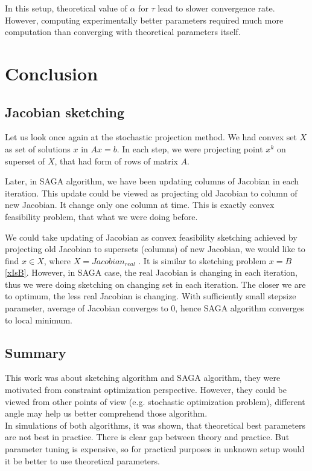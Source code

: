 \documentclass[11pt]{book}
\theoremstyle{definition}
\begin{document}
	In this setup, theoretical value of $\alpha$ for $\tau$ lead to slower convergence rate. However, computing experimentally better parameters required much more computation than converging with theoretical parameters itself.
	
	\chapter{Conclusion}
	
	\section{Jacobian sketching}
	
	Let us look once again at the stochastic projection method. We had convex set $X$ as set of solutions $x$ in $Ax=b$. In each step, we were projecting point $x^k$ on superset of $X$, that had form of rows of matrix $A$.
	
	Later, in SAGA algorithm, we have been updating columns of Jacobian in each iteration. This update could be viewed as projecting old Jacobian to column of new Jacobian. It change only one column at time. This is exactly convex feasibility problem, that what we were doing before.
	
	We could take updating of Jacobian as convex feasibility sketching achieved by projecting old Jacobian to supersets (columns) of new Jacobian, we would like to find $x \in X$, where $X=Jacobian_{real}$ \cite{jacobianSketching}. It is similar to sketching problem $x=B$ \ref{xIsB}. However, in SAGA case, the real Jacobian is changing in each iteration, thus we were doing sketching on changing set in each iteration. The closer we are to optimum, the less real Jacobian is changing. With sufficiently small stepsize parameter, average of Jacobian converges to $0$, hence SAGA algorithm converges to local minimum.
	
	
	\section{Summary}
	This work was about sketching algorithm and SAGA algorithm, they were motivated from constraint optimization perspective. However, they could be viewed from other points of view (e.g. stochastic optimization problem), different angle may help us better comprehend those algorithm.\\
	
	In simulations of both algorithms, it was shown, that theoretical best parameters are not best in practice. There is clear gap between theory and practice. But parameter tuning is expensive, so for practical purposes in unknown setup would it be better to use theoretical parameters.
	
\end{document}
